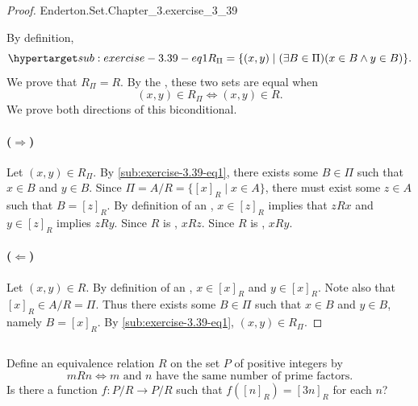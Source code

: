 \documentclass{report}
\begin{document}
\begin{proof}

    {Enderton.Set.Chapter\_3.exercise\_3\_39}

  By definition,
    \begin{equation}
      \hyperlabel{sub:exercise-3.39-eq1}
      R_\Pi = \{ (x, y) \mid (\exists B \in \Pi)(x \in B \land y \in B) \}.
    \end{equation}
  We prove that $R_\Pi = R$.
  By the , these two sets are equal when
    $$(x, y) \in R_\Pi \iff (x, y) \in R.$$
  We prove both directions of this biconditional.

  \paragraph{($\Rightarrow$)}%

    Let $(x, y) \in R_\Pi$.
    By \eqref{sub:exercise-3.39-eq1}, there exists some $B \in \Pi$ such that
      $x \in B$ and $y \in B$.
    Since $\Pi = A / R = \{[x]_R \mid x \in A\}$, there must exist some
      $z \in A$ such that $B = [z]_R$.
    By definition of an , $x \in [z]_R$ implies
      that $zRx$ and $y \in [z]_R$ implies $zRy$.
    Since $R$ is , $xRz$.
    Since $R$ is , $xRy$.

  \paragraph{($\Leftarrow$)}%

    Let $(x, y) \in R$.
    By definition of an , $x \in [x]_R$ and
      $y \in [x]_R$.
    Note also that $[x]_R \in A / R = \Pi$.
    Thus there exists some $B \in \Pi$ such that $x \in B$ and $y \in B$, namely
      $B = [x]_R$.
    By \eqref{sub:exercise-3.39-eq1}, $(x, y) \in R_\Pi$.

\end{proof}

\subsection{}%

Define an equivalence relation $R$ on the set $P$ of positive integers by
  $$mRn \iff m \text{ and } n \text{ have the same number of prime factors}.$$
Is there a function $f \colon P / R \rightarrow P / R$ such that
  $f([n]_R) = [3n]_R$ for each $n$?
\end{document}
